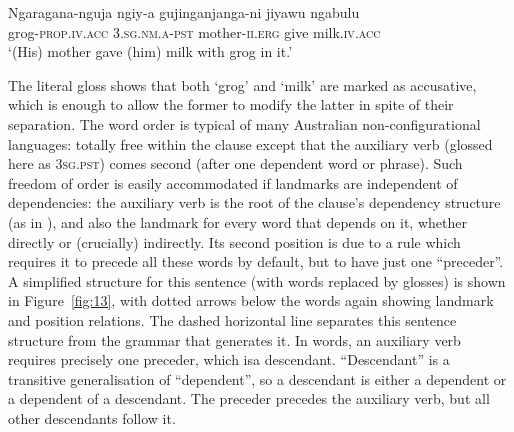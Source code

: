 \documentclass[output=paper
 	        ,biblatex
                ,babelshorthands
                ,newtxmath
                ,draftmode
                ,colorlinks, citecolor=brown
]{langscibook}
\begin{document}
\begin{exe}
	\ex \label{ex:19}
	\gll Ngaragana-nguja ngiy-a gujinganjanga-ni jiyawu ngabulu\\
	grog\textsc{-prop}.\textsc{iv}.\textsc{acc} 3.\textsc{sg}.\textsc{nm}.\textsc{a}-\textsc{pst} mother-\textsc{ii}.\textsc{erg} give milk.\textsc{iv}.\textsc{acc}\\
	\glt ‘(His) mother gave (him) milk with grog in it.’
\end{exe}

The literal gloss shows that both ‘grog’ and ‘milk’ are marked as accusative, which is enough to allow the former to modify the latter in spite of their separation. The word order is typical of many Australian non-configurational languages: totally free within the clause except that the auxiliary verb (glossed here as \textsc{3sg.pst}) comes second (after one dependent word or phrase). Such freedom of order is easily accommodated if landmarks are independent of dependencies: the auxiliary verb is the root of the clause’s dependency structure (as in ), and also the landmark for every word that depends on it, whether directly or (crucially) indirectly. Its second position is due to a rule which requires it to precede all these words by default, but to have just one ``preceder''. A simplified structure for this sentence (with  words replaced by  glosses) is shown in Figure~\ref{fig:13}, with dotted arrows below the words again showing landmark and position relations. The dashed horizontal line separates this sentence structure from the grammar that generates it. In words, an auxiliary verb requires precisely one preceder, which isa descendant. ``Descendant'' is a transitive generalisation of ``dependent'', so a descendant is either a dependent or a dependent of a descendant. The preceder precedes the auxiliary verb, but all other descendants follow it.
\end{document}
